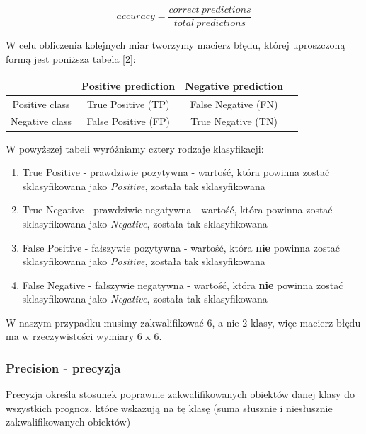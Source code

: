\documentclass{classrep}
\begin{document}
\begin{equation}
accuracy = \frac{correct\ predictions}{total\ predictions}
\end{equation}

W celu obliczenia kolejnych miar tworzymy macierz błędu, której uproszczoną formą jest poniższa tabela [2]:
\newline
\newline

\begin{center}
	\begin{tabular}{ |c|c|c|c| } 
	\hline
	 & Positive prediction & Negative prediction \\
	\hline
	Positive class & True Positive (TP) & False Negative (FN) \\ 
	\hline
	Negative class & False Positive (FP) & True Negative (TN) \\ 
	\hline
	\end{tabular}
\end{center}

\newpage
W powyższej tabeli wyróżniamy cztery rodzaje klasyfikacji:
\begin{enumerate}
\item True Positive - prawdziwie pozytywna - wartość, która powinna zostać sklasyfikowana jako \emph{Positive}, została tak sklasyfikowana
\item True Negative - prawdziwie negatywna - wartość, która powinna zostać sklasyfikowana jako \emph{Negative}, została tak sklasyfikowana
\item False Positive - fałszywie pozytywna - wartość, która \textbf{nie} powinna zostać sklasyfikowana jako \emph{Positive}, została tak sklasyfikowana
\item False Negative - fałszywie negatywna - wartość, która \textbf{nie} powinna zostać sklasyfikowana jako \emph{Negative}, została tak sklasyfikowana
\newline
\end{enumerate}
W naszym przypadku musimy zakwalifikować 6, a nie 2 klasy, więc macierz błędu ma w rzeczywistości wymiary 6 x 6.


\subsubsection{Precision - precyzja}
Precyzja określa stosunek poprawnie zakwalifikowanych obiektów danej klasy do wszystkich prognoz, które wskazują na tę klasę (suma słusznie i niesłusznie zakwalifikowanych obiektów)
\end{document}
